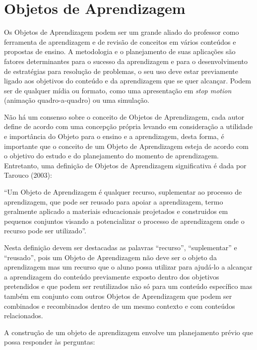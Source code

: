 \documentclass[12pt, openright, a4paper, brazil, english, french, spanish, bibjustif, openany, oneside]{abntex2}
\begin{document}
\section{Objetos de Aprendizagem}

Os Objetos de Aprendizagem podem ser um grande aliado do professor como ferramenta de aprendizagem e de revisão de conceitos em vários conteúdos e propostas de ensino. A metodologia e o planejamento de suas aplicações são fatores determinantes para o sucesso da aprendizagem e para o desenvolvimento de estratégias para resolução de problemas, o seu uso deve estar previamente ligado aos objetivos do conteúdo e da aprendizagem que se quer alcançar. Podem ser de qualquer mídia ou formato, como uma apresentação em \textit{stop motion} (animação quadro-a-quadro) ou uma simulação.

Não há um consenso sobre o conceito de Objetos de Aprendizagem, cada autor define de acordo com uma concepção própria levando em consideração a utilidade e importância do Objeto para o ensino e a aprendizagem, desta forma, é importante que o conceito de um Objeto de Aprendizagem esteja de acordo com o objetivo do estudo e do planejamento do momento de aprendizagem. Entretanto, uma definição de Objetos de Aprendizagem significativa é dada por Tarouco (2003):


\begin{citacao}

``Um Objeto de Aprendizagem é qualquer recurso, suplementar ao processo de aprendizagem, que pode ser reusado para apoiar a aprendizagem, termo geralmente aplicado a materiais educacionais projetados e construidos em pequenos conjuntos visando a potencializar o processo de aprendizagem onde o recurso pode ser utilizado''\cite{tarouco}.

\end{citacao}

Nesta definição devem ser destacadas as palavras ``recurso'', ``suplementar'' e ``reusado'', pois um Objeto de Aprendizagem não deve ser o objeto da aprendizagem mas um recurso que o aluno possa utilizar para ajudá-lo a alcançar a aprendizagem do conteúdo previamente exposto dentro dos objetivos pretendidos e que podem ser reutilizados não só para um conteúdo específico mas também em conjunto com outros Objetos de Aprendizagem que podem ser combinados e recombinados dentro de um mesmo contexto e com conteúdos relacionados.

A construção de um objeto de aprendizagem envolve um planejamento prévio que possa responder às perguntas:
\end{document}
